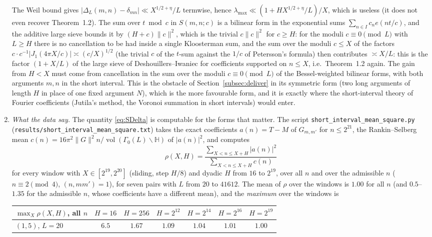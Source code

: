 \documentclass[11pt]{amsart}
\theoremstyle{remark}
\newcommand{\HH}{\mathbb{H}}
\DeclareMathOperator{\vol}{vol}
\begin{document}
\begin{enumerate}[label=\textup{(\alph*)},leftmargin=2.2em]
The Weil bound gives $|\Delta_L(m,n)-\delta_{mn}|\ll X^{1/2+\eta}/L$ termwise, hence $\lambda_{\max}\ll(1+HX^{1/2+\eta}/L)/X$, which is useless (it does not even recover Theorem~1.2). The sum over $t\bmod c$ in $S(m,n;c)$ is a bilinear form in the exponential sums $\sum_{n\in I}c_ne(nt/c)$, and the additive large sieve bounds it by $(H+c)\|c\|^2$, which is the trivial $c\|c\|^2$ for $c\ge H$: for the moduli $c\equiv0\pmod L$ with $L\ge H$ there is no cancellation to be had inside a single Kloosterman sum, and the sum over the moduli $c\le X$ of the factors $c\cdot c^{-1}|J_1(4\pi X/c)|\asymp(c/X)^{1/2}$ (the trivial $c$ of the $t$-sum against the $1/c$ of Petersson's formula) then contributes $\asymp X/L$: this is the factor $(1+X/L)$ of the large sieve of Deshouillers--Iwaniec for coefficients supported on $n\le X$, i.e.\ Theorem~1.2 again. The gain from $H<X$ must come from cancellation in the sum over the moduli $c\equiv0\pmod L$ of the Bessel-weighted bilinear forms, with both arguments $m,n$ in the short interval. This is the obstacle of Section~\ref{subsec:deliver} in its symmetric form (two long arguments of length $H$ in place of one fixed argument $N$), which is the more favourable form, and it is exactly where the short-interval theory of Fourier coefficients (Jutila's method, the Voronoi summation in short intervals) would enter.
\item \emph{What the data say.} The quantity \eqref{eq:SDelta} is computable for the forms that matter. The script \texttt{short\_interval\_mean\_square.py} (\texttt{results/short\_interval\_mean\_square.txt}) takes the exact coefficients $a(n)=T-M$ of $G_{m,m'}$ for $n\le2^{21}$, the Rankin--Selberg mean $c(n)=16\pi^2\|G\|^2n/\vol(\Gamma_0(L)\backslash\HH)$ of $|a(n)|^2$, and computes
\[
\rho(X,H)=\frac{\sum_{X<n\le X+H}|a(n)|^2}{\sum_{X<n\le X+H}c(n)}
\]
for every window with $X\in[2^{19},2^{20}]$ (sliding, step $H/8$) and dyadic $H$ from $16$ to $2^{19}$, over all $n$ and over the admissible $n$ ($n\equiv2\pmod4$, $(n,mm')=1$), for seven pairs with $L$ from $20$ to $41612$. The mean of $\rho$ over the windows is $1.00$ for all $n$ (and $0.5$--$1.35$ for the admissible $n$, whose coefficients have a different mean), and the \emph{maximum} over the windows is
\begin{center}\small
\begin{tabular}{l|cccccc}
\toprule
$\max_X\rho(X,H)$, all $n$ & $H=16$ & $H=256$ & $H=2^{12}$ & $H=2^{14}$ & $H=2^{16}$ & $H=2^{19}$\\
\midrule
$(1,5)$, $L=20$ & $6.5$ & $1.67$ & $1.09$ & $1.04$ & $1.01$ & $1.00$\\

\end{tabular}
\end{center}
\end{enumerate}
\end{document}
